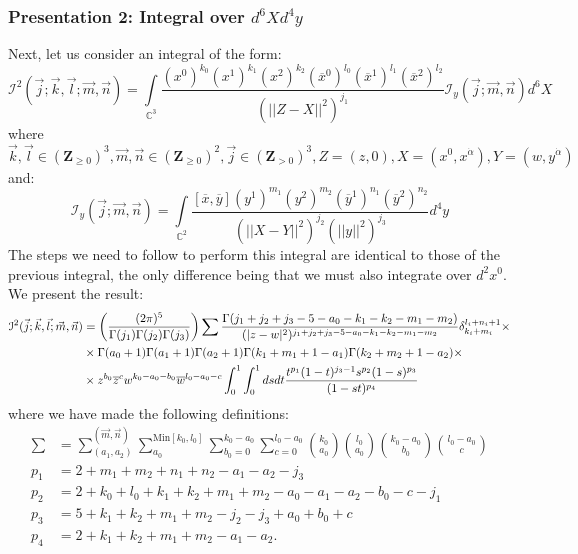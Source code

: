 \documentclass[../main.tex]{subfiles}
\begin{document}
\subsubsection{Presentation 2: Integral over $d^6X d^4y$}

Next, let us consider an integral of the form:
\begin{equation}
    \mathcal{I}^2(\vec{j};\vec{k},\vec{l};\vec{m}, \vec{n}) = \underset{\mathbb{C}^3}{\int} \frac{ (x^0)^{k_0} (x^1)^{k_1} (x^2)^{k_2} (\overline{x}^0)^{l_0} (\overline{x}^1)^{l_1} (\overline{x}^2)^{l_2}}{(\vert \vert Z-X \vert \vert^2)^{j_1}} \mathcal{I}_y (\vec{j};\vec{m}, \vec{n}) d^6X \label{eq:main type 2}
\end{equation}
where $\vec{k},\vec{l} \in (\mathbf{Z}_{\geq 0})^3, \vec{m},\vec{n} \in (\mathbf{Z}_{\geq 0})^2, \vec{j} \in (\mathbf{Z}_{>0})^3, Z = (z,0), X = (x^0,x^{\dot{\alpha}}), Y = (w,y^{\dot{\alpha}})$ and:  
\begin{equation}
    \mathcal{I}_y (\vec{j};\vec{m}, \vec{n}) = \underset{\mathbb{C}^2}{\int} \frac{[\overline{x},\overline{y}] (y^1)^{m_1} (y^2)^{m_2} (\overline{y}^1)^{n_1} (\overline{y}^2)^{n_2}}{(\vert \vert X-Y \vert \vert^2)^{j_2} (\vert \vert y \vert \vert^2)^{j_3}} d^4y
\end{equation}
The steps we need to follow to perform this integral are identical to those of the previous integral, the only difference being that we must also integrate over $d^2x^0$. We present the result: 
\begingroup \allowdisplaybreaks \begin{align}\label{eq:noncentralintegral}
\mathcal{I}^2(\vec{j};\vec{k},\vec{l};\vec{m}, \vec{n}) &= \bigg(\frac{(2\pi)^5}{\Gamma(j_1) \Gamma(j_2) \Gamma(j_3)}\bigg) \sum \frac{\Gamma(j_1+j_2+j_3-5-a_0-k_1-k_2-m_1-m_2)}{(\vert z-w \vert^2)^{j_1+j_2+j_3-5-a_0-k_1-k_2-m_1-m_2}} \delta_{k_i+m_i}^{l_i+n_i+1} \times \notag \\
&\times  \Gamma(a_0+1) \Gamma(a_1+1) \Gamma(a_2+1) \Gamma(k_1+m_1+1-a_1) \Gamma(k_2+m_2+1-a_2) \times \notag \\
&\times z^{b_0} \overline{z}^c w^{k_0-a_0-b_0} \overline{w}^{l_0-a_0-c} \int_0^1 \int_0^1 ds dt \frac{t^{p_1} (1-t)^{j_3-1} s^{p_2} (1-s)^{p_3}}{(1-st)^{p_4}}
\end{align} \endgroup
where we have made the following definitions:
\begingroup \allowdisplaybreaks \begin{align}
\sum & = \sum_{(a_1,a_2)}^{(\vec{m},\vec{n})} \sum_{a_0}^{\text{Min}[k_0,l_0]} \sum_{b_0=0}^{k_0-a_0} \sum_{c=0}^{l_0-a_0} {k_0 \choose a_0} {l_0 \choose a_0} {k_0-a_0 \choose b_0} {l_0-a_0 \choose c} \\
    p_1 &= 2+m_1+m_2+n_1+n_2-a_1-a_2-j_3 \\ p_2 &= 2+k_0+l_0+k_1+k_2+m_1+m_2-a_0-a_1-a_2-b_0-c-j_1 \\  p_3 &= 5+k_1+k_2+m_1+m_2-j_2-j_3+a_0+b_0+c \\ p_4 &= 2+k_1+k_2+m_1+m_2-a_1-a_2.
\end{align} \endgroup
\end{document}
